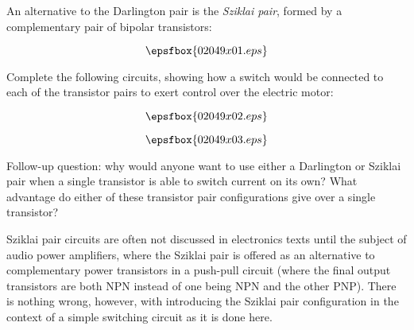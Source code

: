 

An alternative to the Darlington pair is the {\it Sziklai pair}, formed by a complementary pair of bipolar transistors:

$$\epsfbox{02049x01.eps}$$

Complete the following circuits, showing how a switch would be connected to each of the transistor pairs to exert control over the electric motor:

$$\epsfbox{02049x02.eps}$$







$$\epsfbox{02049x03.eps}$$

Follow-up question: why would anyone want to use either a Darlington or Sziklai pair when a single transistor is able to switch current on its own?  What advantage do either of these transistor pair configurations give over a single transistor?







Sziklai pair circuits are often not discussed in electronics texts until the subject of audio power amplifiers, where the Sziklai pair is offered as an alternative to complementary power transistors in a push-pull circuit (where the final output transistors are both NPN instead of one being NPN and the other PNP).  There is nothing wrong, however, with introducing the Sziklai pair configuration in the context of a simple switching circuit as it is done here.




